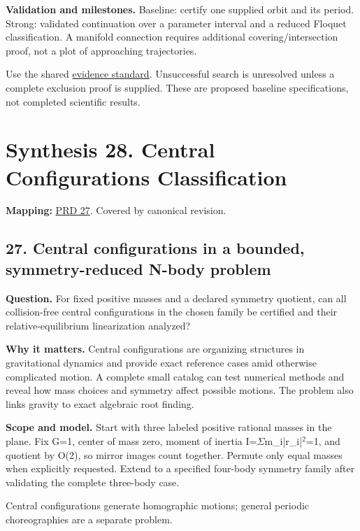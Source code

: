 \documentclass[
  11pt,
]{article}
\begin{document}
\textbf{Validation and milestones.} Baseline: certify one supplied orbit
and its period. Strong: validated continuation over a parameter interval
and a reduced Floquet classification. A manifold connection requires
additional covering/intersection proof, not a plot of approaching
trajectories.

Use the shared
\href{https://github.com/rick-stevens-ai/Pure-Thought/blob/main/reviews/EVIDENCE-STANDARD.md}{evidence
standard}. Unsuccessful search is unresolved unless a complete exclusion
proof is supplied. These are proposed baseline specifications, not
completed scientific results.

\section{Synthesis 28. Central Configurations Classification}

\textbf{Mapping:}
\href{https://github.com/rick-stevens-ai/Pure-Thought/blob/main/PRDs/27-N-Body-Central-Configurations.md}{PRD
27}. Covered by canonical revision.

\subsection{27. Central configurations in a bounded, symmetry-reduced
N-body problem}

\textbf{Question.} For fixed positive masses and a declared symmetry
quotient, can all collision-free central configurations in the chosen
family be certified and their relative-equilibrium linearization
analyzed?

\textbf{Why it matters.} Central configurations are organizing
structures in gravitational dynamics and provide exact reference cases
amid otherwise complicated motion. A complete small catalog can test
numerical methods and reveal how mass choices and symmetry affect
possible motions. The problem also links gravity to exact algebraic root
finding.

\textbf{Scope and model.} Start with three labeled positive rational
masses in the plane. Fix G=1, center of mass zero, moment of inertia
I=\ensuremath{\Sigma}m\_i|r\_i|\ensuremath{{}^{2}}=1, and quotient by
O(2), so mirror images count together. Permute only equal masses when
explicitly requested. Extend to a specified four-body symmetry family
after validating the complete three-body case.

Central configurations generate homographic motions; general periodic
choreographies are a separate problem.
\end{document}
